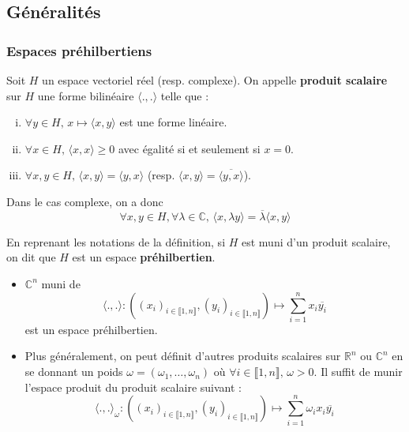 




	\subsection{Généralités}
	
	\subsubsection{Espaces préhilbertiens}
	
	
	\begin{definition}
		Soit $H$ un espace vectoriel réel (resp. complexe). On appelle \textbf{produit scalaire} sur $H$ une forme bilinéaire $\langle . , . \rangle$ telle que :
		\begin{enumerate}[(i)]
			\item $\forall y \in H, \, x \mapsto \langle x, y \rangle$ est une forme linéaire.
			\item $\forall x \in H, \, \langle x, x \rangle \geq 0$ avec égalité si et seulement si $x = 0$.
			\item $\forall x, y \in H, \, \langle x, y \rangle = \langle y, x \rangle$ (resp. $\langle x, y \rangle = \overline{\langle y, x \rangle}$).
		\end{enumerate}
	\end{definition}
	
	\begin{remark}
		Dans le cas complexe, on a donc
		\[ \forall x, y \in H, \forall \lambda \in \mathbb{C}, \, \langle x, \lambda y \rangle = \overline{\lambda} \langle x, y \rangle \]
	\end{remark}
	
	\begin{definition}
		En reprenant les notations de la définition, si $H$ est muni d'un produit scalaire, on dit que $H$ est un espace \textbf{préhilbertien}.
	\end{definition}
	
	\begin{example}
		\begin{itemize}
			\item $\mathbb{C}^n$ muni de
			\[ \langle ., . \rangle : ((x_i)_{i \in \llbracket 1, n \rrbracket},(y_i)_{i \in \llbracket 1, n \rrbracket}) \mapsto \sum_{i=1}^{n} x_i \overline{y_i} \]
			est un espace préhilbertien.
			\item Plus généralement, on peut définit d'autres produits scalaires sur $\mathbb{R}^n$ ou $\mathbb{C}^n$ en se donnant un poids $\omega = (\omega_1, \dots, \omega_n)$ où $\forall i \in \llbracket 1, n \rrbracket, \, \omega > 0$. Il suffit de munir l'espace produit du produit scalaire suivant :
			\[ \langle ., . \rangle_\omega : ((x_i)_{i \in \llbracket 1, n \rrbracket},(y_i)_{i \in \llbracket 1, n \rrbracket}) \mapsto \sum_{i=1}^{n} \omega_i x_i \overline{y_i} \]
		\end{itemize}
	\end{example}
	

